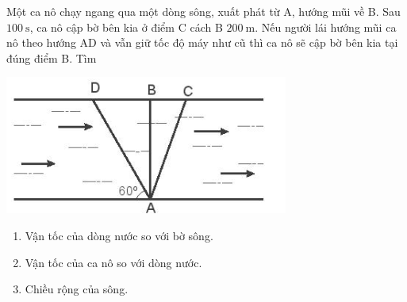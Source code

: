 \begin{ex}
	Một ca nô chạy ngang qua một dòng sông, xuất phát từ A, hướng mũi về B. Sau $\SI{100}{\second}$, ca nô cập bờ bên kia ở điểm C cách B $\SI{200}{\meter}$. Nếu người lái hướng mũi ca nô theo hướng AD và vẫn giữ tốc độ máy như cũ thì ca nô sẽ cập bờ bên kia tại đúng điểm B. Tìm
	\begin{center}
		\includegraphics[scale=0.7]{figs/G10Y25B5-10}
	\end{center}
	\begin{enumerate}[label=\alph*)]
		\item Vận tốc của dòng nước so với bờ sông.
		\item Vận tốc của ca nô so với dòng nước.
		\item Chiều rộng của sông.
	\end{enumerate}
\end{ex}
